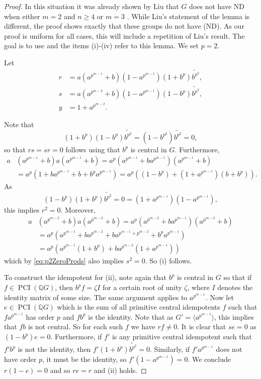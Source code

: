 \documentclass[a4paper,10pt]{amsart}
\theoremstyle{definition}
\theoremstyle{remark}
\newcommand\PCI{\operatorname{PCI}}
\begin{document}
\begin{proof}
In this situation it was already shown by Liu that $G$ does not have ND when either $m = 2$ and $n \geq 4$ or $m = 3$ \cite[Lemma 2.8]{Liu}. While Liu's statement of the lemma is different, the proof shows exactly that these groups do not have (ND). As our proof is uniform for all cases, this will include a repetition of Liu's result. The goal is to use  and the items (i)-(iv) refer to this lemma. We set $p=2$.

Let 
\begin{align*}
r &= a(a^{p^{m-1}}+b)(1-a^{p^{m-1}})(1+b^p)\widetilde{b^{p^2}}, \\
s &= a(a^{p^{m-2}}+b)(1-a^{p^{m-1}})(1-b^p)\widetilde{b^{p^2}}, \\
y &= 1 + a^{p^{m-2}}.
\end{align*}

Note that
\[(1+b^p)(1-b^p)\widetilde{b^{p^2}} = (1-b^{p^2})\widetilde{b^{p^2}} = 0, \]
so that $rs = sr = 0$ follows using that $b^p$ is central in $G$. Furthermore,
\begin{align*}
a&(a^{p^{m-1}} + b)a(a^{p^{m-1}}+b) = a^p(a^{p^{m-1}} + ba^{p^{m-1}})(a^{p^{m-1}}+b) \\
 &= a^p(1 + ba^{p^{m-1}} + b + b^pa^{p^{m-1}}) = a^p((1-b^p) + (1+a^{p^{m-1}})(b+b^p)).
\end{align*}
As 
\begin{equation}\label{eq:p2ZeroProds}
(1-b^p)(1+b^p)\widetilde{b^{p^2}} = 0 = (1+a^{p^{m-1}})(1-a^{p^{m-1}}),
\end{equation}
this implies $r^2 = 0$. Moreover,
\begin{align*}
a&(a^{p^{m-2}}+b)a(a^{p^{m-2}}+b) = a^p (a^{p^{m-2}} + ba^{p^{m-1}})(a^{p^{m-2}} + b) \\
 &= a^p (a^{p^{m-1}} + ba^{p^{m-2}} + ba^{p^{m-1} + p^{m-2}} + b^pa^{p^{m-1}}) \\
  &= a^p(a^{p^{m-1}}(1+b^p) + ba^{p^{m-2}}(1 + a^{p^{m-1}}))
\end{align*}
which by \eqref{eq:p2ZeroProds} also implies $s^2 = 0$. So (i) follows.

To construct the idempotent for (ii), note again that $b^p$ is central in $G$ so that if $f \in \PCI(\mathbb{Q}G)$, then $b^pf = \zeta I$ for a certain root of unity $\zeta$, where $I$ denotes the identity matrix of some size. The same argument applies to $a^{p^{m-1}}$. Now let $e \in \PCI(\mathbb{Q}G)$ which is the sum of all primitive central idempotents $f$ such that $fa^{p^{m-1}}$ has order $p$ and $fb^p$ is the identity. Note that as $G' = \langle a^{p^{m-1}} \rangle$, this implies that $fb$ is not central. So for each such $f$ we have $rf \neq 0$. It is clear that $se = 0$ as $(1-b^p)e=0$. Furthermore, if $f'$ is any primitive central idempotent such that $f'b^p$ is not the identity, then $f'(1+b^p) \widetilde{b^{p^2}} = 0$. Similarly, if $f'a^{p^{m-1}}$ does not have order $p$, it must be the identity, so $f'(1-a^{p^{m-1}}) = 0$. We conclude $r(1-e) = 0$ and so $re = r$ and (ii) holds.


\end{proof}
\end{document}
